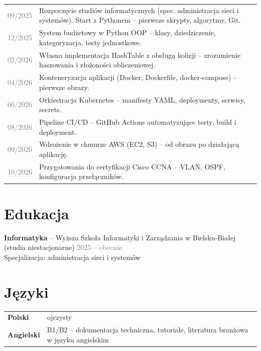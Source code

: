 \documentclass[a4paper,10pt]{article}
\newcommand{\dateline}[2]{\textcolor{graytext}{#1} & #2 \\}
\begin{document}
\small
\renewcommand{\arraystretch}{1.2}
\begin{tabularx}{\textwidth}{p{2cm} X}
\dateline{09/2025}{Rozpoczęcie studiów informatycznych (spec. administracja sieci i systemów). Start z Pythonem -- pierwsze skrypty, algorytmy, Git.}
\dateline{12/2025}{System budżetowy w Python OOP -- klasy, dziedziczenie, kategoryzacja, testy jednostkowe.}
\dateline{02/2026}{Własna implementacja HashTable z obsługą kolizji -- zrozumienie haszowania i złożoności obliczeniowej.}
\dateline{04/2026}{Konteneryzacja aplikacji (Docker, Dockerfile, docker-compose) -- pierwsze obrazy.}
\dateline{06/2026}{Orkiestracja Kubernetes -- manifesty YAML, deploymenty, serwisy, secrets.}
\dateline{08/2026}{Pipeline CI/CD -- GitHub Actions automatyzujące testy, build i deployment.}
\dateline{09/2026}{Wdrożenie w chmurze AWS (EC2, S3) -- od obrazu po działającą aplikację.}
\dateline{10/2026}{Przygotowania do certyfikacji Cisco CCNA -- VLAN, OSPF, konfiguracja przełączników.}
\end{tabularx}

\vspace{0.6em}

\section{Edukacja}

\small
\noindent\textbf{Informatyka} -- Wyższa Szkoła Informatyki i Zarządzania w Bielsku-Białej (studia niestacjonarne) \hfill \textcolor{graytext}{2025 -- obecnie} \\
Specjalizacja: administracja sieci i systemów

\vspace{0.6em}

\section{Języki}

\small
\begin{tabularx}{\textwidth}{p{3.5cm} X}
\textbf{Polski} & ojczysty \\
\textbf{Angielski} & B1/B2 -- dokumentacja techniczna, tutoriale, literatura branżowa w języku angielskim
\end{tabularx}

\vspace{0.6em}

\end{document}
